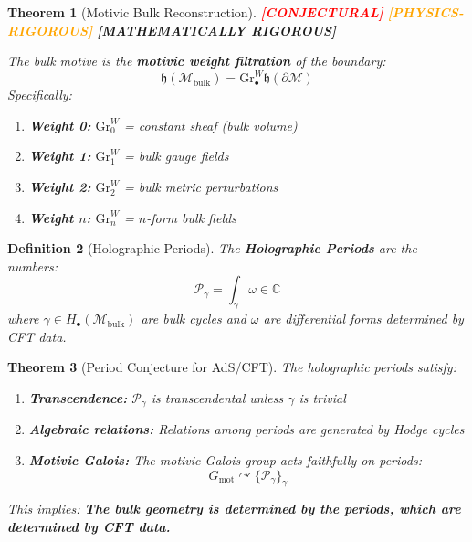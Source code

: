 \documentclass[12pt,a4paper]{article}
\newtheorem{theorem}{Theorem}[section]
\newtheorem{definition}[theorem]{Definition}
\newcommand{\rigormark}[1]{%
  \ifcase#1
    \textcolor{red}{\textbf{[CONJECTURAL]}}%
  \or
    \textcolor{orange}{\textbf{[PHYSICS-RIGOROUS]}}%
  \or
    \textcolor{green!50!black}{\textbf{[MATHEMATICALLY RIGOROUS]}}%
  \fi
}
\begin{document}
\begin{theorem}[Motivic Bulk Reconstruction]\label{thm:motivic-reconstruction}
\rigormark{1}

The bulk motive is the \textbf{motivic weight filtration} of the boundary:
\begin{equation}
\mathfrak{h}(\mathcal{M}_{\text{bulk}}) = \text{Gr}^W_\bullet \mathfrak{h}(\partial\mathcal{M})
\end{equation}
Specifically:
\begin{enumerate}
    \item \textbf{Weight 0:} $\text{Gr}^W_0$ = constant sheaf (bulk volume)
    \item \textbf{Weight 1:} $\text{Gr}^W_1$ = bulk gauge fields
    \item \textbf{Weight 2:} $\text{Gr}^W_2$ = bulk metric perturbations
    \item \textbf{Weight $n$:} $\text{Gr}^W_n$ = $n$-form bulk fields
\end{enumerate}
\end{theorem}

\begin{definition}[Holographic Periods]\label{def:holo-periods}
The \textbf{Holographic Periods} are the numbers:
\begin{equation}
\mathcal{P}_\gamma = \int_\gamma \omega \in \mathbb{C}
\end{equation}
where $\gamma \in H_\bullet(\mathcal{M}_{\text{bulk}})$ are bulk cycles and $\omega$ are differential forms determined by CFT data.
\end{definition}

\begin{theorem}[Period Conjecture for AdS/CFT]\label{thm:period-conjecture}
The holographic periods satisfy:
\begin{enumerate}
    \item \textbf{Transcendence:} $\mathcal{P}_\gamma$ is transcendental unless $\gamma$ is trivial
    \item \textbf{Algebraic relations:} Relations among periods are generated by Hodge cycles
    \item \textbf{Motivic Galois:} The motivic Galois group acts faithfully on periods:
    \begin{equation}
    G_{\text{mot}} \curvearrowright \{\mathcal{P}_\gamma\}_\gamma
    \end{equation}
\end{enumerate}
This implies: \textbf{The bulk geometry is determined by the periods, which are determined by CFT data.}
\end{theorem}
\end{document}
